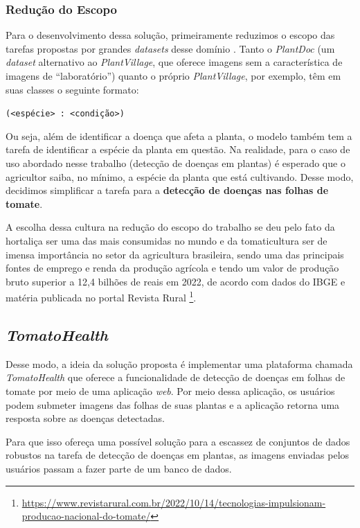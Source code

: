 \subsubsection{Redução do Escopo}
Para o desenvolvimento dessa solução, primeiramente reduzimos o escopo das tarefas propostas por grandes \emph{datasets} desse domínio \citep{Yao2023}. Tanto o \emph{PlantDoc} (um \emph{dataset} alternativo ao \emph{PlantVillage}, que oferece imagens sem a característica de imagens de ``laboratório'') quanto o próprio \emph{PlantVillage}, por exemplo, têm em suas classes o seguinte formato:
\begin{center}
    \texttt{(<espécie> : <condição>)}
\end{center}
Ou seja, além de identificar a doença que afeta a planta, o modelo também tem a tarefa de identificar a espécie da planta em questão. Na realidade, para o caso de uso abordado nesse trabalho (detecção de doenças em plantas) é esperado que o agricultor saiba, no mínimo, a espécie da planta que está cultivando. Desse modo, decidimos simplificar a tarefa para a {\bf detecção de doenças nas folhas de tomate}.

A escolha dessa cultura na redução do escopo do trabalho se deu pelo fato da hortaliça ser uma das mais consumidas no mundo e da tomaticultura ser de imensa importância no setor da agricultura brasileira, sendo uma das principais fontes de emprego e renda da produção agrícola e tendo um valor de produção bruto superior a 12,4 bilhões de reais em 2022, de acordo com dados do IBGE e matéria publicada no portal Revista Rural \footnote{\url{https://www.revistarural.com.br/2022/10/14/tecnologias-impulsionam-producao-nacional-do-tomate/}}.

\subsection{\emph{TomatoHealth}}
Desse modo, a ideia da solução proposta é implementar uma plataforma chamada \emph{TomatoHealth} que oferece a funcionalidade de detecção de doenças em folhas de tomate por meio de uma aplicação \emph{web}. Por meio dessa aplicação, os usuários podem submeter imagens das folhas de suas plantas e a aplicação retorna uma resposta sobre as doenças detectadas.

Para que isso ofereça uma possível solução para a escassez de conjuntos de dados robustos na tarefa de detecção de doenças em plantas, as imagens enviadas pelos usuários passam a fazer parte de um banco de dados. 

